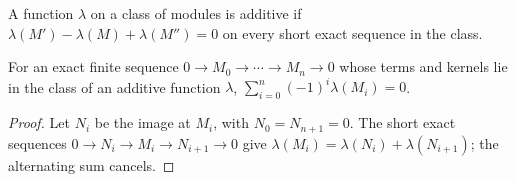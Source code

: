 \begin{definition}
\label{am-def-additive-function}
\uses{}
A function $\lambda$ on a class of modules is additive if
$\lambda(M')-\lambda(M)+\lambda(M'')=0$ on every short exact sequence in the
class.
\end{definition}
\begin{proposition}
\label{am-prop-2-11}
\uses{}
For an exact finite sequence $0\to M_0\to\cdots\to M_n\to0$ whose terms and
kernels lie in the class of an additive function $\lambda$,
$\sum_{i=0}^n(-1)^i\lambda(M_i)=0$.
\end{proposition}
\begin{proof}
Let $N_i$ be the image at $M_i$, with $N_0=N_{n+1}=0$.  The short exact
sequences $0\to N_i\to M_i\to N_{i+1}\to0$ give
$\lambda(M_i)=\lambda(N_i)+\lambda(N_{i+1})$; the alternating sum cancels.
\end{proof}

